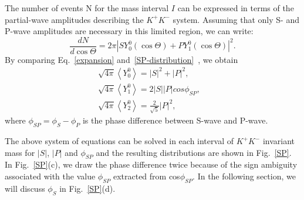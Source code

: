 {    The number of events N for the mass interval $I$ can be expressed in terms of the partial-wave amplitudes describing the $K^{+}K^{-}$ system. Assuming that only S- and P-wave amplitudes are necessary in this limited region, we can write:
    \begin{equation}
        \frac{dN}{d\cos\Theta} = 2\pi\left|SY_{0}^{0}(\cos\Theta) + PY_{1}^{0}(\cos\Theta)\right|^{2}.\label{SP-distribution}
    \end{equation}
    By comparing Eq.~\ref{expansion} and~\ref{SP-distribution}~\cite{PRD56-7299}, we obtain 
    \begin{equation}
        \begin{array}{lr}
            \sqrt{4\pi}\left\langle Y_{0}^{0}\right\rangle = \left|S\right|^{2} + \left|P\right|^{2}, &\\ 
            \sqrt{4\pi}\left\langle Y_{1}^{0}\right\rangle = 2\left|S\right|\left|P\right|cos\phi_{SP}, &\\ 
            \sqrt{4\pi}\left\langle Y_{2}^{0}\right\rangle = \frac{2}{\sqrt{5}}\left|P\right|^{2}, &
        \end{array}\label{SP-RES} 
    \end{equation}
    where $\phi_{SP} = \phi_{S} - \phi_{P}$ is the phase difference between S-wave and P-wave.



    The above system of equations can be solved in each interval of $K^{+}K^{-}$ invariant mass for $\left|S\right|$, $\left|P\right|$ and $\phi_{SP}$ and the resulting distributions are shown in Fig.~\ref{SP}. 
    In Fig.~\ref{SP}(c), we draw the phase difference twice because of the sign ambiguity associated with the value $\phi_{SP}$ extracted from cos$\phi_{SP}$.
    In the following section, we will discuss $\phi_{S}$ in Fig.~\ref{SP}(d).

}


